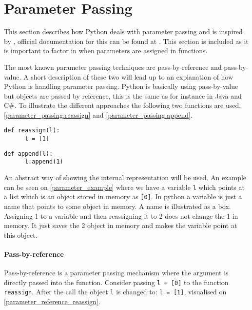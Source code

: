 \section{Parameter Passing}\label{python:parameter_passing}
This section describes how Python deals with parameter passing and is inspired by \citet{parameter_passing}, official documentation for this can be found at \citet{parameter_passing_official}.
This section is included as it is important to factor in when parameters are assigned in functions.

The most known parameter passing techniques are pass-by-reference and pass-by-value.
A short description of these two will lead up to an explanation of how Python is handling parameter passing.
Python is basically using pass-by-value but objects are passed by reference, this is the same as for instance in Java and C\#.
To illustrate the different approaches the following two functions are used, \cref{parameter_passing:reassign} and \cref{parameter_passing:append}.

\begin{lstlisting}[style=python, caption={Parameter passing: \texttt{reassign} function.}, label={parameter_passing:reassign}]
  def reassign(l):
      l = [1]
\end{lstlisting}

\begin{lstlisting}[style=python, caption={Parameter passing: \texttt{append} function.}, label={parameter_passing:append}]
  def append(l):
      l.append(1)
\end{lstlisting}

An abstract way of showing the internal representation will be used.
An example can be seen on \cref{parameter_example} where we have a variable \texttt{l} which points at a list which is an object stored in memory as \texttt{[0]}.
In python a variable is just a name that points to some object in memory.
A name is illustrated as a box.
Assigning 1 to a variable and then reassigning it to 2 does not change the 1 in memory.
It just saves the 2 object in memory and makes the variable point at this object.


\paragraph{Pass-by-reference}
Pass-by-reference is a parameter passing mechanism where the argument is directly passed into the function.
Consider passing \texttt{l = [0]} to the function \texttt{reassign}.
After the call the object \texttt{l} is changed to: \texttt{l = [1]}, visualised on \cref{parameter_reference_reassign}.

